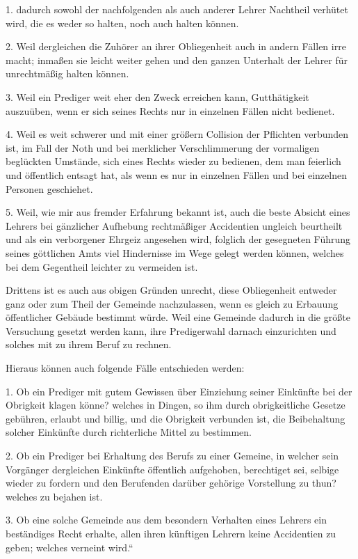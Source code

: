 1. dadurch sowohl der nachfolgenden als auch anderer Lehrer Nachtheil verhütet wird, die es weder so halten, noch auch halten können.

2. Weil dergleichen die Zuhörer an ihrer Obliegenheit auch in andern Fällen irre macht; inmaßen sie leicht weiter gehen und den ganzen Unterhalt der Lehrer für unrechtmäßig halten können.

3. Weil ein Prediger weit eher den Zweck erreichen kann, Gutthätigkeit auszuüben, wenn er sich seines Rechts nur in einzelnen Fällen nicht bedienet.

4. Weil es weit schwerer und mit einer größern Collision der Pflichten verbunden ist, im Fall der Noth und bei merklicher Verschlimmerung der vormaligen beglückten Umstände, sich eines Rechts wieder zu bedienen, dem man feierlich und öffentlich entsagt hat, als wenn es nur in einzelnen Fällen und bei einzelnen Personen geschiehet.

5. Weil, wie mir aus fremder Erfahrung bekannt ist, auch die beste Absicht eines Lehrers bei gänzlicher Aufhebung rechtmäßiger Accidentien ungleich beurtheilt und als ein verborgener Ehrgeiz angesehen wird, folglich der gesegneten Führung seines göttlichen Amts viel Hindernisse im Wege gelegt werden können, welches bei dem Gegentheil leichter zu vermeiden ist.

Drittens ist es auch aus obigen Gründen unrecht,
diese Obliegenheit entweder ganz oder zum Theil der Gemeinde nachzulassen, wenn es gleich zu Erbauung öffentlicher Gebäude bestimmt würde. Weil eine Gemeinde dadurch in die größte Versuchung gesetzt werden kann, ihre Predigerwahl darnach einzurichten und solches mit zu ihrem Beruf zu rechnen.

Hieraus können auch folgende Fälle entschieden werden:

1. Ob ein Prediger mit gutem Gewissen über Einziehung seiner Einkünfte bei der Obrigkeit klagen könne? welches in Dingen, so ihm durch obrigkeitliche Gesetze gebühren, erlaubt und billig, und die Obrigkeit verbunden ist, die Beibehaltung solcher Einkünfte durch richterliche Mittel zu bestimmen.

2. Ob ein Prediger bei Erhaltung des Berufs zu einer Gemeine, in welcher sein Vorgänger dergleichen Einkünfte öffentlich aufgehoben, berechtiget sei, selbige wieder zu fordern und den Berufenden darüber gehörige Vorstellung zu thun? welches zu bejahen ist.

3. Ob eine solche Gemeinde aus dem besondern Verhalten eines Lehrers ein beständiges Recht erhalte, allen ihren künftigen Lehrern keine Accidentien zu geben; welches verneint wird.“

